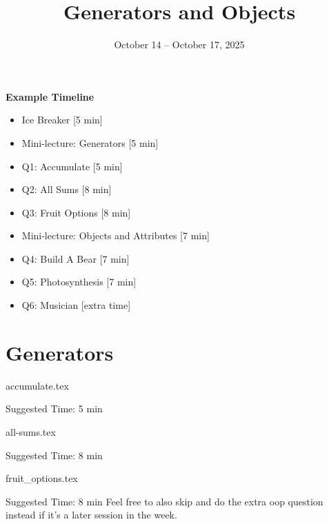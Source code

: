 \documentclass{exam}
\title{Generators and Objects}
\date{October 14 -- October 17, 2025}
\begin{document}
\maketitle

\begin{meta}
    \textbf{Example Timeline}
    \begin{itemize}
        \item Ice Breaker [5 min]
        \item Mini-lecture: Generators [5 min]
        \item Q1: Accumulate [5 min]
        \item Q2: All Sums [8 min]
        \item Q3: Fruit Options [8 min]
        \item Mini-lecture: Objects and Attributes [7 min]
        \item Q4: Build A Bear [7 min]
        \item Q5:  Photosynthesis [7 min]
        \item Q6: Musician [extra time]
    \end{itemize}

\end{meta}

\section{Generators}
\begin{questions}
    {accumulate.tex}
    \begin{questionmeta}
        Suggested Time: 5 min
    \end{questionmeta}

    {all-sums.tex}
    \begin{questionmeta}
        Suggested Time: 8 min
    \end{questionmeta}

    {fruit_options.tex}
    \begin{questionmeta}
        Suggested Time: 8 min
        Feel free to also skip and do the extra oop question instead if it's a later session in the week. 
    \end{questionmeta}

\end{questions}
\end{document}
